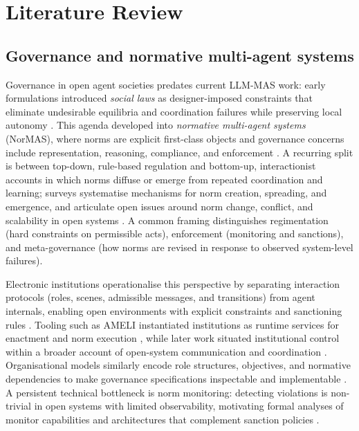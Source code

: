 \documentclass[11pt, a4paper]{article}
\begin{document}
\section{Literature Review}
\label{sec:literature_review}

\subsection{Governance and normative multi-agent systems}
Governance in open agent societies predates current LLM-MAS work: early formulations introduced \emph{social laws} as designer-imposed constraints that eliminate undesirable equilibria and coordination failures while preserving local autonomy \citep{Shoham1995SocialLaws}. This agenda developed into \emph{normative multi-agent systems} (NorMAS), where norms are explicit first-class objects and governance concerns include representation, reasoning, compliance, and enforcement \citep{Boella2006IntroNorMAS,Boella2007NormativeMAS,Boella2008NorMASSpecialIssue}. A recurring split is between top-down, rule-based regulation and bottom-up, interactionist accounts in which norms diffuse or emerge from repeated coordination and learning; surveys systematise mechanisms for norm creation, spreading, and emergence, and articulate open issues around norm change, conflict, and scalability in open systems \citep{Savarimuthu2011NormSurvey,Criado2011OpenIssuesNorMAS}. A common framing distinguishes regimentation (hard constraints on permissible acts), enforcement (monitoring and sanctions), and meta-governance (how norms are revised in response to observed system-level failures).

Electronic institutions operationalise this perspective by separating interaction protocols (roles, scenes, admissible messages, and transitions) from agent internals, enabling open environments with explicit constraints and sanctioning rules \citep{Esteva2001ElectronicInstitutions,Arcos2005ElectronicInstitutions,GarciaCamino2005ImplementingNorms}. Tooling such as AMELI instantiated institutions as runtime services for enactment and norm execution \citep{Esteva2004AMELI}, while later work situated institutional control within a broader account of open-system communication and coordination \citep{dInverno2012CommunicatingOpenSystems}. Organisational models similarly encode role structures, objectives, and normative dependencies to make governance specifications inspectable and implementable \citep{Dignum2005OMNI}. A persistent technical bottleneck is norm monitoring: detecting violations is non-trivial in open systems with limited observability, motivating formal analyses of monitor capabilities and architectures that complement sanction policies \citep{Bulling2013MonitoringNormViolations,Dastani2018MonitoringNorms}.
\end{document}
